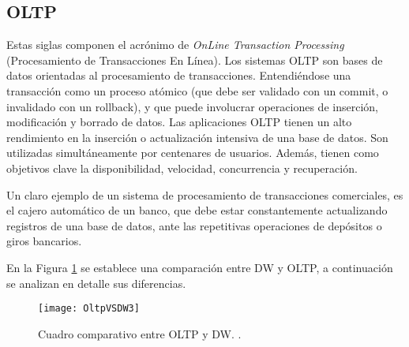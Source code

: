 \documentclass[a4paper,11pt]{article}
\begin{document}
    
    \subsection{OLTP}
    
    Estas siglas componen el acrónimo de \textit{OnLine Transaction Processing} (Procesamiento de Transacciones En Línea).
    Los sistemas OLTP son bases de datos orientadas al procesamiento de transacciones.
    Entendiéndose una transacción como un proceso
    atómico (que debe ser validado con un commit, o invalidado con un rollback), y que puede involucrar operaciones de inserción, modificación y
    borrado de datos.
    Las aplicaciones OLTP tienen un alto rendimiento en la inserción o actualización intensiva de una base de datos. Son utilizadas
    simultáneamente por centenares de usuarios. Además, tienen como objetivos clave la disponibilidad, velocidad, concurrencia y recuperación.
    
    Un claro ejemplo de un sistema de procesamiento de transacciones comerciales, es el cajero automático de un banco, que debe estar constantemente actualizando
    registros de una base de datos, ante las repetitivas operaciones de depósitos o giros bancarios.
    
    En la Figura \ref{oltp_vs_olap} se establece una comparación entre DW y OLTP, a continuación se analizan en detalle sus diferencias.
    
    \begin{figure}
      \begin{center}
        \texttt{[image: OltpVSDW3]}
        \caption{Cuadro comparativo entre OLTP y DW. \cite[p.~42]{hefestov2}.}
        \label{oltp_vs_olap}
      \end{center}
    \end{figure}
    
\end{document}
